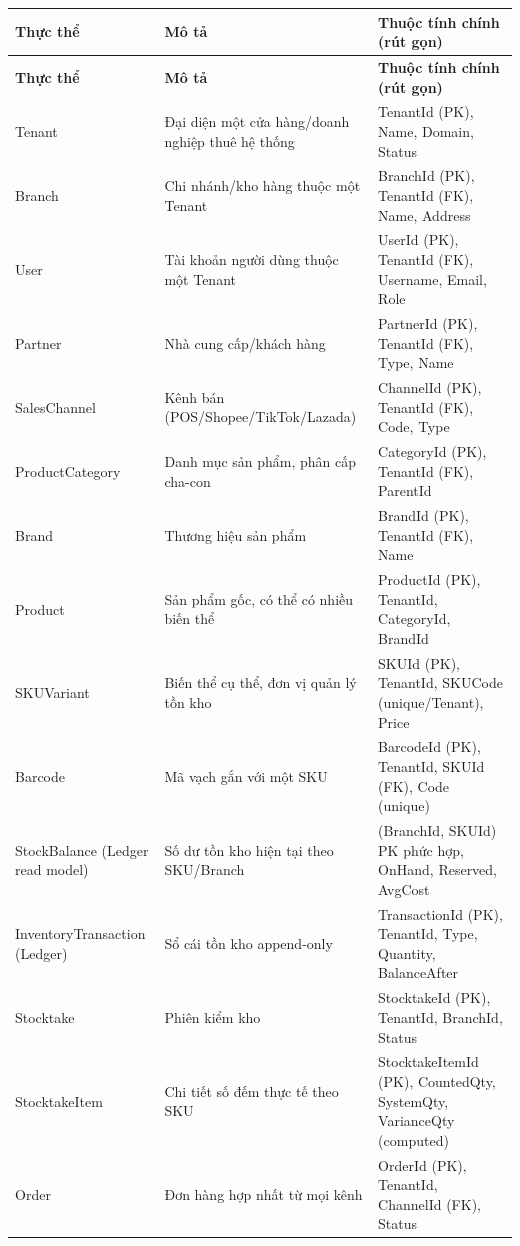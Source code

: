 \begin{longtable}{|p{3.4cm}|p{5.5cm}|p{5cm}|}
    \hline
    \textbf{Thực thể} & \textbf{Mô tả} & \textbf{Thuộc tính chính (rút gọn)} \\
    \hline
    \endfirsthead
    \hline
    \textbf{Thực thể} & \textbf{Mô tả} & \textbf{Thuộc tính chính (rút gọn)} \\
    \hline
    \endhead
    Tenant & Đại diện một cửa hàng/doanh nghiệp thuê hệ thống & TenantId (PK), Name, Domain, Status \\
    \hline
    Branch & Chi nhánh/kho hàng thuộc một Tenant & BranchId (PK), TenantId (FK), Name, Address \\
    \hline
    User & Tài khoản người dùng thuộc một Tenant & UserId (PK), TenantId (FK), Username, Email, Role \\
    \hline
    Partner & Nhà cung cấp/khách hàng & PartnerId (PK), TenantId (FK), Type, Name \\
    \hline
    SalesChannel & Kênh bán (POS/Shopee/TikTok/Lazada) & ChannelId (PK), TenantId (FK), Code, Type \\
    \hline
    ProductCategory & Danh mục sản phẩm, phân cấp cha-con & CategoryId (PK), TenantId (FK), ParentId \\
    \hline
    Brand & Thương hiệu sản phẩm & BrandId (PK), TenantId (FK), Name \\
    \hline
    Product & Sản phẩm gốc, có thể có nhiều biến thể & ProductId (PK), TenantId, CategoryId, BrandId \\
    \hline
    SKUVariant & Biến thể cụ thể, đơn vị quản lý tồn kho & SKUId (PK), TenantId, SKUCode (unique/Tenant), Price \\
    \hline
    Barcode & Mã vạch gắn với một SKU & BarcodeId (PK), TenantId, SKUId (FK), Code (unique) \\
    \hline
    StockBalance (Ledger read model) & Số dư tồn kho hiện tại theo SKU/Branch & (BranchId, SKUId) PK phức hợp, OnHand, Reserved, AvgCost \\
    \hline
    InventoryTransaction (Ledger) & Sổ cái tồn kho append-only & TransactionId (PK), TenantId, Type, Quantity, BalanceAfter \\
    \hline
    Stocktake & Phiên kiểm kho & StocktakeId (PK), TenantId, BranchId, Status \\
    \hline
    StocktakeItem & Chi tiết số đếm thực tế theo SKU & StocktakeItemId (PK), CountedQty, SystemQty, VarianceQty (computed) \\
    \hline
    Order & Đơn hàng hợp nhất từ mọi kênh & OrderId (PK), TenantId, ChannelId (FK), Status \\

\end{longtable}
